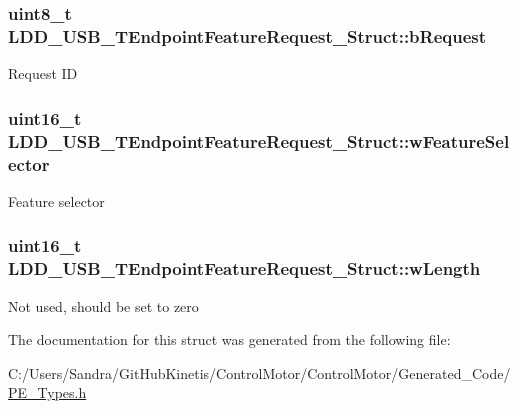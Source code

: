 \subsubsection[{\texorpdfstring{b\+Request}{bRequest}}]{\setlength{\rightskip}{0pt plus 5cm}uint8\+\_\+t L\+D\+D\+\_\+\+U\+S\+B\+\_\+\+T\+Endpoint\+Feature\+Request\+\_\+\+Struct\+::b\+Request}\hypertarget{struct_l_d_d___u_s_b___t_endpoint_feature_request___struct_acd2dcd4a8762d22f84cfe3b9d9607a25}{}\label{struct_l_d_d___u_s_b___t_endpoint_feature_request___struct_acd2dcd4a8762d22f84cfe3b9d9607a25}
Request ID 
\subsubsection[{\texorpdfstring{w\+Feature\+Selector}{wFeatureSelector}}]{\setlength{\rightskip}{0pt plus 5cm}uint16\+\_\+t L\+D\+D\+\_\+\+U\+S\+B\+\_\+\+T\+Endpoint\+Feature\+Request\+\_\+\+Struct\+::w\+Feature\+Selector}\hypertarget{struct_l_d_d___u_s_b___t_endpoint_feature_request___struct_aa026e7ce420430dc65a72dcc10337553}{}\label{struct_l_d_d___u_s_b___t_endpoint_feature_request___struct_aa026e7ce420430dc65a72dcc10337553}
Feature selector 
\subsubsection[{\texorpdfstring{w\+Length}{wLength}}]{\setlength{\rightskip}{0pt plus 5cm}uint16\+\_\+t L\+D\+D\+\_\+\+U\+S\+B\+\_\+\+T\+Endpoint\+Feature\+Request\+\_\+\+Struct\+::w\+Length}\hypertarget{struct_l_d_d___u_s_b___t_endpoint_feature_request___struct_aec7dc034039bc4deb5c811afac0686a5}{}\label{struct_l_d_d___u_s_b___t_endpoint_feature_request___struct_aec7dc034039bc4deb5c811afac0686a5}
Not used, should be set to zero 

The documentation for this struct was generated from the following file\+:\begin{DoxyCompactItemize}
\item 
C\+:/\+Users/\+Sandra/\+Git\+Hub\+Kinetis/\+Control\+Motor/\+Control\+Motor/\+Generated\+\_\+\+Code/\hyperlink{_p_e___types_8h}{P\+E\+\_\+\+Types.\+h}\end{DoxyCompactItemize}
